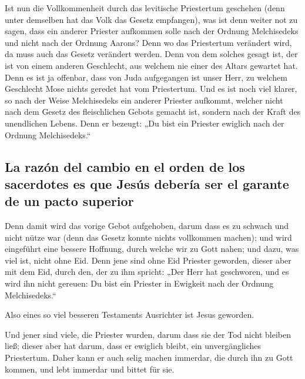  Ist nun die Vollkommenheit durch das levitische
Priestertum geschehen (denn unter demselben hat das Volk das Gesetz
empfangen), was ist denn weiter not zu sagen, dass ein anderer Priester
aufkommen solle nach der Ordnung Melchisedeks und nicht nach der Ordnung
Aarons?  Denn wo das Priestertum verändert wird, da muss
auch das Gesetz verändert werden.  Denn von dem solches
gesagt ist, der ist von einem anderen Geschlecht, aus welchem nie einer
des Altars gewartet hat.  Denn es ist ja offenbar, dass
von Juda aufgegangen ist unser Herr, zu welchem Geschlecht Mose nichts
geredet hat vom Priestertum.  Und es ist noch viel
klarer, so nach der Weise Melchisedeks ein anderer Priester aufkommt,
 welcher nicht nach dem Gesetz des fleischlichen Gebots
gemacht ist, sondern nach der Kraft des unendlichen Lebens.
 Denn er bezeugt: „Du bist ein Priester ewiglich nach der
Ordnung Melchisedeks.``

\hypertarget{la-razuxf3n-del-cambio-en-el-orden-de-los-sacerdotes-es-que-jesuxfas-deberuxeda-ser-el-garante-de-un-pacto-superior}{%
\subsection{La razón del cambio en el orden de los sacerdotes es que
Jesús debería ser el garante de un pacto
superior}\label{la-razuxf3n-del-cambio-en-el-orden-de-los-sacerdotes-es-que-jesuxfas-deberuxeda-ser-el-garante-de-un-pacto-superior}}

 Denn damit wird das vorige Gebot aufgehoben, darum dass
es zu schwach und nicht nütze war  (denn das Gesetz
konnte nichts vollkommen machen); und wird eingeführt eine bessere
Hoffnung, durch welche wir zu Gott nahen;  und dazu, was
viel ist, nicht ohne Eid. Denn jene sind ohne Eid Priester geworden,
 dieser aber mit dem Eid, durch den, der zu ihm spricht:
„Der Herr hat geschworen, und es wird ihn nicht gereuen: Du bist ein
Priester in Ewigkeit nach der Ordnung Melchisedeks.``

 Also eines so viel besseren Testaments Ausrichter ist
Jesus geworden.

 Und jener sind viele, die Priester wurden, darum dass
sie der Tod nicht bleiben ließ;  dieser aber hat darum,
dass er ewiglich bleibt, ein unvergängliches Priestertum.
 Daher kann er auch selig machen immerdar, die durch ihn
zu Gott kommen, und lebt immerdar und bittet für sie.

